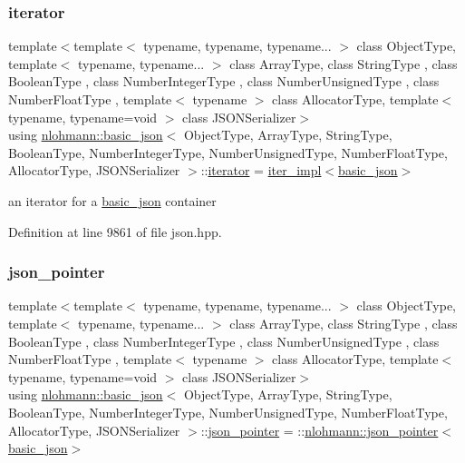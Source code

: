 \subsubsection{\texorpdfstring{iterator}{iterator}}
{\footnotesize\ttfamily template$<$template$<$ typename, typename, typename... $>$ class Object\+Type, template$<$ typename, typename... $>$ class Array\+Type, class String\+Type , class Boolean\+Type , class Number\+Integer\+Type , class Number\+Unsigned\+Type , class Number\+Float\+Type , template$<$ typename $>$ class Allocator\+Type, template$<$ typename, typename=void $>$ class J\+S\+O\+N\+Serializer$>$ \\
using \hyperlink{classnlohmann_1_1basic__json}{nlohmann\+::basic\+\_\+json}$<$ Object\+Type, Array\+Type, String\+Type, Boolean\+Type, Number\+Integer\+Type, Number\+Unsigned\+Type, Number\+Float\+Type, Allocator\+Type, J\+S\+O\+N\+Serializer $>$\+::\hyperlink{classnlohmann_1_1basic__json_a099316232c76c034030a38faa6e34dca}{iterator} =  \hyperlink{classnlohmann_1_1basic__json_abfd677a136936c16adf01e335f6a7a72}{iter\+\_\+impl}$<$\hyperlink{classnlohmann_1_1basic__json}{basic\+\_\+json}$>$}



an iterator for a \hyperlink{classnlohmann_1_1basic__json}{basic\+\_\+json} container 



Definition at line 9861 of file json.\+hpp.

\mbox{\label{classnlohmann_1_1basic__json_a6886a5001f5b449ad316101a311ce536}} 
\subsubsection{\texorpdfstring{json\+\_\+pointer}{json\_pointer}}
{\footnotesize\ttfamily template$<$template$<$ typename, typename, typename... $>$ class Object\+Type, template$<$ typename, typename... $>$ class Array\+Type, class String\+Type , class Boolean\+Type , class Number\+Integer\+Type , class Number\+Unsigned\+Type , class Number\+Float\+Type , template$<$ typename $>$ class Allocator\+Type, template$<$ typename, typename=void $>$ class J\+S\+O\+N\+Serializer$>$ \\
using \hyperlink{classnlohmann_1_1basic__json}{nlohmann\+::basic\+\_\+json}$<$ Object\+Type, Array\+Type, String\+Type, Boolean\+Type, Number\+Integer\+Type, Number\+Unsigned\+Type, Number\+Float\+Type, Allocator\+Type, J\+S\+O\+N\+Serializer $>$\+::\hyperlink{classnlohmann_1_1basic__json_a6886a5001f5b449ad316101a311ce536}{json\+\_\+pointer} =  \+::\hyperlink{classnlohmann_1_1json__pointer}{nlohmann\+::json\+\_\+pointer}$<$\hyperlink{classnlohmann_1_1basic__json}{basic\+\_\+json}$>$}



